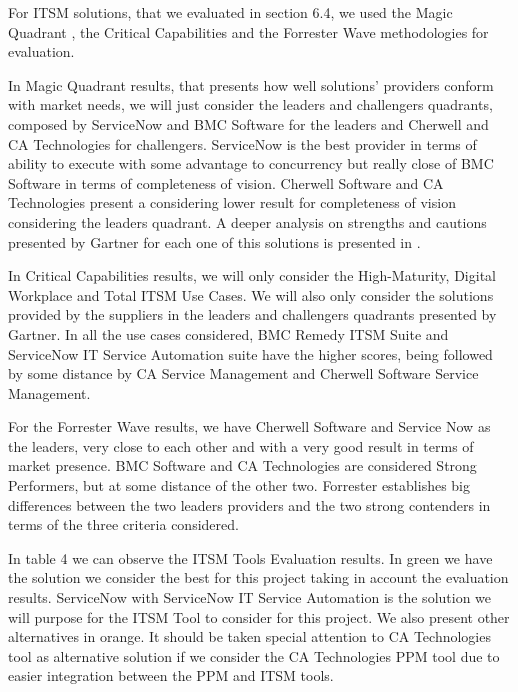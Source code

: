 For ITSM solutions, that we evaluated in section 6.4, we used the Magic Quadrant , the Critical Capabilities and the Forrester Wave methodologies for evaluation.\par
In Magic Quadrant results, that presents how well solutions' providers conform with market needs, we will just consider the leaders and challengers quadrants, composed by ServiceNow and BMC Software for the leaders and Cherwell and CA Technologies for challengers. ServiceNow is the best provider in terms of ability to execute with some advantage to concurrency but really close of BMC Software in terms of completeness of vision. Cherwell Software and CA Technologies present a considering lower result for completeness of vision considering the leaders quadrant. A deeper analysis on strengths and cautions presented by Gartner for each one of this solutions is presented in \cite{magicQuadrantITSM}.\par
In Critical Capabilities results, we will only consider the High-Maturity, Digital Workplace and Total ITSM Use Cases. We will also only consider the solutions provided by the suppliers in the leaders and challengers quadrants presented by Gartner. In all the use cases considered, BMC Remedy ITSM Suite and ServiceNow IT Service Automation suite have the higher scores, being followed by some distance by CA Service Management and Cherwell Software Service Management.\par
For the Forrester Wave results, we have Cherwell Software and Service Now as the leaders, very close to each other and with a very good result in terms of market presence. BMC Software and CA Technologies are considered Strong Performers, but at some distance of the other two. Forrester establishes big differences between the two leaders providers and the two strong contenders in terms of the three criteria considered.\par
In table 4 we can observe the ITSM Tools Evaluation results. In green we have the solution we consider the best for this project taking in account the evaluation results. ServiceNow with ServiceNow IT Service Automation is the solution we will purpose for the ITSM Tool to consider for this project. We also present other alternatives in orange. It should be taken special attention to CA Technologies tool as alternative solution if we consider the CA Technologies PPM tool due to easier integration between the PPM and ITSM tools.\par


